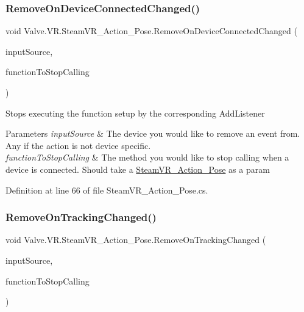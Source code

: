 \subsubsection{\texorpdfstring{RemoveOnDeviceConnectedChanged()}{RemoveOnDeviceConnectedChanged()}}
{\footnotesize\ttfamily void Valve.\+V\+R.\+Steam\+V\+R\+\_\+\+Action\+\_\+\+Pose.\+Remove\+On\+Device\+Connected\+Changed (\begin{DoxyParamCaption}\item[{\mbox{\hyperlink{namespace_valve_1_1_v_r_a82e5bf501cc3aa155444ee3f0662853f}{Steam\+V\+R\+\_\+\+Input\+\_\+\+Sources}}}]{input\+Source,  }\item[{\mbox{\hyperlink{class_valve_1_1_v_r_1_1_steam_v_r___action___pose_a40c6d9862680e8c99781b3a109d94b82}{Device\+Connected\+Change\+Handler}}}]{function\+To\+Stop\+Calling }\end{DoxyParamCaption})}



Stops executing the function setup by the corresponding Add\+Listener 


\begin{DoxyParams}{Parameters}
{\em input\+Source} & The device you would like to remove an event from. Any if the action is not device specific.\\
\hline
{\em function\+To\+Stop\+Calling} & The method you would like to stop calling when a device is connected. Should take a \mbox{\hyperlink{class_valve_1_1_v_r_1_1_steam_v_r___action___pose}{Steam\+V\+R\+\_\+\+Action\+\_\+\+Pose}} as a param\\
\hline
\end{DoxyParams}


Definition at line 66 of file Steam\+V\+R\+\_\+\+Action\+\_\+\+Pose.\+cs.

\mbox{\label{class_valve_1_1_v_r_1_1_steam_v_r___action___pose_a2683c19d679fb0e5ddf4c05ea9f5520e}} 
\subsubsection{\texorpdfstring{RemoveOnTrackingChanged()}{RemoveOnTrackingChanged()}}
{\footnotesize\ttfamily void Valve.\+V\+R.\+Steam\+V\+R\+\_\+\+Action\+\_\+\+Pose.\+Remove\+On\+Tracking\+Changed (\begin{DoxyParamCaption}\item[{\mbox{\hyperlink{namespace_valve_1_1_v_r_a82e5bf501cc3aa155444ee3f0662853f}{Steam\+V\+R\+\_\+\+Input\+\_\+\+Sources}}}]{input\+Source,  }\item[{\mbox{\hyperlink{class_valve_1_1_v_r_1_1_steam_v_r___action___pose_a52e352705659c14685cf8a88ef4bafd6}{Tracking\+Change\+Handler}}}]{function\+To\+Stop\+Calling }\end{DoxyParamCaption})}



